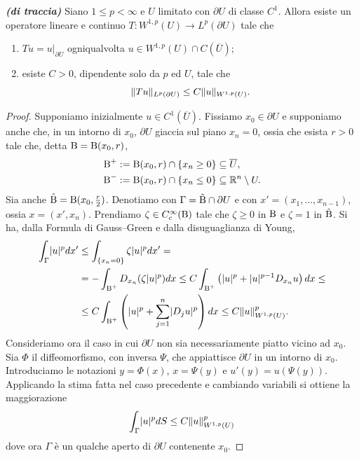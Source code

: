 \begin{teorema} \emph{\textbf{(di traccia)}}
	Siano $1 \le p < \infty$ e $U$ limitato con $\partial U$ di classe $C^1$. Allora esiste un operatore lineare e continuo $T: W^{1,p}(U) \to L^p(\partial U)$ tale che
	\begin{enumerate}[$(a)$]
		\item $Tu = u |_{\partial U}$ ogniqualvolta $u \in W^{1,p}(U) \cap C(\overline{U})$;
		\item esiste $C >0$, dipendente solo da $p$ ed $U$, tale che
		\[ \lVert Tu\rVert_{L^p(\partial U)} \le C \lVert u\rVert_{W^{1,p}(U)}. \]
	\end{enumerate}
\end{teorema}
\begin{proof}
	Supponiamo inizialmente $u \in C^1(\overline{U})$. Fissiamo $x_0 \in \partial U$ e supponiamo anche che, in un intorno di $x_0$, $\partial U$ giaccia sul piano $x_n = 0$, ossia che esista $r > 0 $ tale che, detta $\textup{B} = \textup{B}(x_0,r)$,
	\begin{align*}
		\textup{B}^+ &:= \textup{B}(x_0,r) \cap \left\lbrace x_n \ge 0\right\rbrace \subseteq \overline{U}, \\
		\textup{B}^- &:= \textup{B}(x_0,r) \cap \left\lbrace x_n \le 0\right\rbrace \subseteq \mathbb{R}^n \setminus U.
	\end{align*}
	Sia anche $\hat{\textup{B}} = \textup{B}(x_0,\frac{r}{2}) $. Denotiamo con $\Gamma = \hat{\textup{B}} \cap \partial U$ e con $x' = \left( x_1,\dots, x_{n-1}\right) $, ossia $x = (x',x_n)$. Prendiamo $\zeta \in C^{\infty}_c(\textup{B})$ tale che $\zeta \ge 0$ in $\textup{B}$ e $\zeta = 1$ in $\hat{\textup{B}}$. Si ha, dalla Formula di Gauss--Green e dalla disuguaglianza di Young,
	\begin{align*}
		\int_\Gamma \lvert u\rvert^pdx' &\le \int_{\left\lbrace x_n = 0\right\rbrace } \zeta \lvert u\rvert^pdx' = \\
		& = - \int_{\textup{B}^+} D_{x_n}(\zeta \lvert u\rvert^p)dx \le C \int_{\textup{B}^+} \left( \lvert u\rvert^p + \lvert u\rvert^{p-1}D_{x_n}u\right)  dx \le \\
		&\le C \int_{\textup{B}^+} \left( \lvert u\rvert^p + \sum_{j=1}^{n} \lvert D_ju\rvert^p\right)  dx \le C \lVert u\rVert^p_{W^{1,p}(U)}.
	\end{align*}
	Consideriamo ora il caso in cui $\partial U$ non sia necessariamente piatto vicino ad $x_0$. Sia $\Phi$ il diffeomorfismo, con inversa $\Psi$, che appiattisce $\partial U$ in un intorno di $x_0$. Introduciamo le notazioni $y = \Phi(x)$, $x = \Psi(y)$ e $u'(y) = u(\Psi(y))$. Applicando la stima fatta nel caso precedente e cambiando variabili si ottiene la maggiorazione
	\[ 	\int_\Gamma \lvert u\rvert^pdS \le C \lVert u\rVert^p_{W^{1,p}(U)} \]
	dove ora $\Gamma$ è un qualche aperto di $\partial U$ contenente $x_0$.
	

\end{proof}
